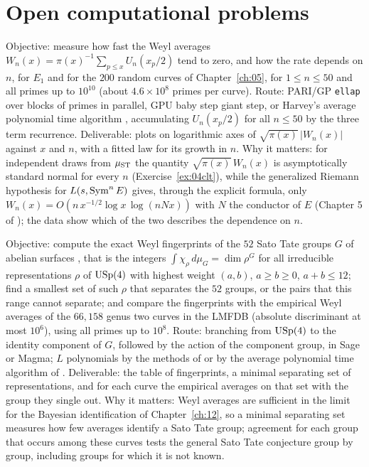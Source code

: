 \section{Open computational problems}

\begin{compproblem}
Objective: measure how fast the Weyl averages $W_n(x) = \pi(x)^{-1}\sum_{p\le x}U_n(x_p/2)$ tend to zero, and how the rate depends on $n$, for $E_1$ and for the $200$ random curves of Chapter~\ref{ch:05}, for $1 \le n \le 50$ and all primes up to $10^{10}$ (about $4.6\times10^8$ primes per curve). Route: PARI/GP \texttt{ellap} over blocks of primes in parallel, GPU baby step giant step, or Harvey's average polynomial time algorithm \cite{harvey2014}, accumulating $U_n(x_p/2)$ for all $n \le 50$ by the three term recurrence. Deliverable: plots on logarithmic axes of $\sqrt{\pi(x)}\,|W_n(x)|$ against $x$ and $n$, with a fitted law for its growth in $n$. Why it matters: for independent draws from $\mu_{\mathrm{ST}}$ the quantity $\sqrt{\pi(x)}\,W_n(x)$ is asymptotically standard normal for every $n$ (Exercise~\ref{ex:04clt}), while the generalized Riemann hypothesis for $L(s,\operatorname{Sym}^n E)$ gives, through the explicit formula, only $W_n(x) = O(n\,x^{-1/2}\log x\,\log(nNx))$ with $N$ the conductor of $E$ (Chapter 5 of \cite{iwanieckowalski2004}); the data show which of the two describes the dependence on $n$.
\end{compproblem}

\begin{compproblem}
Objective: compute the exact Weyl fingerprints of the $52$ Sato Tate groups $G$ of abelian surfaces \cite{fkrs2012}, that is the integers $\int\chi_\rho\,d\mu_G = \dim\rho^G$ for all irreducible representations $\rho$ of $\mathrm{USp}(4)$ with highest weight $(a,b)$, $a \ge b \ge 0$, $a + b \le 12$; find a smallest set of such $\rho$ that separates the $52$ groups, or the pairs that this range cannot separate; and compare the fingerprints with the empirical Weyl averages of the $66{,}158$ genus two curves in the LMFDB (absolute discriminant at most $10^6$), using all primes up to $10^8$. Route: branching from $\mathrm{USp}(4)$ to the identity component of $G$, followed by the action of the component group, in Sage or Magma; $L$ polynomials by the methods of \cite{kedlayasutherland2009} or by the average polynomial time algorithm of \cite{harveysutherland2014}. Deliverable: the table of fingerprints, a minimal separating set of representations, and for each curve the empirical averages on that set with the group they single out. Why it matters: Weyl averages are sufficient in the limit for the Bayesian identification of Chapter~\ref{ch:12}, so a minimal separating set measures how few averages identify a Sato Tate group; agreement for each group that occurs among these curves tests the general Sato Tate conjecture group by group, including groups for which it is not known.
\end{compproblem}

